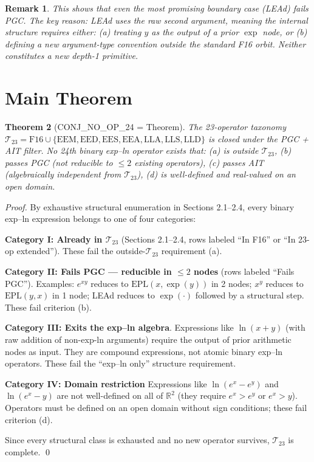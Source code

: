 \documentclass[11pt]{article}
\newtheorem{theorem}{Theorem}
\newtheorem{remark}[theorem]{Remark}
\begin{document}
\begin{remark}
This shows that even the most promising boundary case (LEAd) fails PGC.
The key reason: LEAd uses the raw second argument, meaning the internal structure
requires either: (a) treating $y$ as the output of a prior $\exp$ node,
or (b) defining a new argument-type convention outside the standard F16 orbit.
Neither constitutes a new depth-1 primitive.
\end{remark}

\section{Main Theorem}

\begin{theorem}[CONJ\_NO\_OP\_24 = Theorem]
\label{thm:closure}
The 23-operator taxonomy $\mathcal{T}_{23} = \mathrm{F16} \cup \{\mathrm{EEM, EED, EES, EEA, LLA, LLS, LLD}\}$
is closed under the PGC + AIT filter.
No 24th binary exp--ln operator exists that:
(a) is outside $\mathcal{T}_{23}$,
(b) passes PGC (not reducible to $\leq 2$ existing operators),
(c) passes AIT (algebraically independent from $\mathcal{T}_{23}$),
(d) is well-defined and real-valued on an open domain.
\end{theorem}

\begin{proof}
By exhaustive structural enumeration in Sections 2.1--2.4, every binary
exp--ln expression belongs to one of four categories:

\textbf{Category I: Already in $\mathcal{T}_{23}$} (Sections 2.1--2.4, rows labeled
``In F16'' or ``In 23-op extended''). These fail the outside-$\mathcal{T}_{23}$
requirement (a).

\textbf{Category II: Fails PGC — reducible in $\leq 2$ nodes}
(rows labeled ``Fails PGC''). Examples: $e^{xy}$ reduces to
$\mathrm{EPL}(x, \exp(y))$ in 2 nodes; $x^y$ reduces to $\mathrm{EPL}(y,x)$ in 1 node;
LEAd reduces to $\exp(\cdot)$ followed by a structural step.
These fail criterion (b).

\textbf{Category III: Exits the exp--ln algebra}.
Expressions like $\ln(x+y)$ (with raw addition of non-exp-ln arguments)
require the output of prior arithmetic nodes as input.
They are compound expressions, not atomic binary exp--ln operators.
These fail the ``exp--ln only'' structure requirement.

\textbf{Category IV: Domain restriction}
Expressions like $\ln(e^x - e^y)$ and $\ln(e^x - y)$ are not well-defined on all
of $\mathbb{R}^2$ (they require $e^x > e^y$ or $e^x > y$).
Operators must be defined on an open domain without sign conditions;
these fail criterion (d).

Since every structural class is exhausted and no new operator survives,
$\mathcal{T}_{23}$ is complete. \qed
\end{proof}
\end{document}
